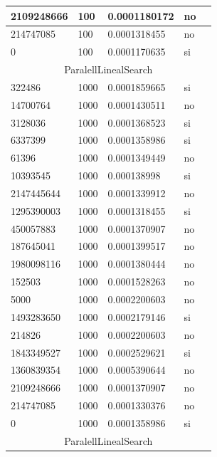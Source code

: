 \documentclass[12pt, fleqn]{article}                             %
\theoremstyle{break}                                            %
\begin{document}
\begin{longtable}{|m{5em}|m{5em}|m{10em}|m{5em}|@{}m{0pt}@{}}
            2109248666& 100  & 0.0001180172 & no &\\[1em]    \hline
            214747085& 100  & 0.0001318455 & no &\\[1em]    \hline
            0& 100  & 0.0001170635 & si &\\[1em]    \hline
            \multicolumn{5}{|c|}{ParalellLinealSearch}   \\          \hline
            322486& 1000  & 0.0001859665 & si &\\[1em]    \hline
            14700764& 1000  & 0.0001430511 & no &\\[1em]    \hline
            3128036& 1000  & 0.0001368523 & si &\\[1em]    \hline
            6337399& 1000  & 0.0001358986 & si &\\[1em]    \hline
            61396& 1000  & 0.0001349449 & no &\\[1em]    \hline
            10393545& 1000  & 0.000138998 & si &\\[1em]    \hline
            2147445644& 1000  & 0.0001339912 & no &\\[1em]    \hline
            1295390003& 1000  & 0.0001318455 & si &\\[1em]    \hline
            450057883& 1000  & 0.0001370907 & no &\\[1em]    \hline
            187645041& 1000  & 0.0001399517 & no &\\[1em]    \hline
            1980098116& 1000  & 0.0001380444 & no &\\[1em]    \hline
            152503& 1000  & 0.0001528263 & no &\\[1em]    \hline
            5000& 1000  & 0.0002200603 & no &\\[1em]    \hline
            1493283650& 1000  & 0.0002179146 & si &\\[1em]    \hline
            214826& 1000  & 0.0002200603 & no &\\[1em]    \hline
            1843349527& 1000  & 0.0002529621 & si &\\[1em]    \hline
            1360839354& 1000  & 0.0005390644 & no &\\[1em]    \hline
            2109248666& 1000  & 0.0001370907 & no &\\[1em]    \hline
            214747085& 1000  & 0.0001330376 & no &\\[1em]    \hline
            0& 1000  & 0.0001358986 & si &\\[1em]    \hline
            \multicolumn{5}{|c|}{ParalellLinealSearch}   \\          \hline

\end{longtable}
\end{document}
